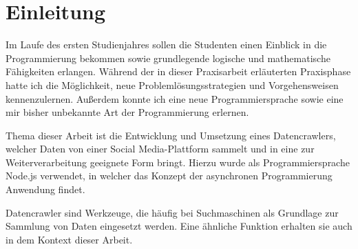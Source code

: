 
\chapter{Einleitung}
Im Laufe des ersten Studienjahres sollen die Studenten einen Einblick in die Programmierung bekommen sowie grundlegende logische und mathematische Fähigkeiten erlangen. Während der in dieser Praxisarbeit erläuterten Praxisphase hatte ich die Möglichkeit, neue Problemlösungsstrategien und Vorgehensweisen kennenzulernen. Außerdem konnte ich eine neue Programmiersprache sowie eine mir bisher unbekannte Art der Programmierung erlernen.

Thema dieser Arbeit ist die Entwicklung und Umsetzung eines Datencrawlers, welcher Daten von einer Social Media-Plattform sammelt und in eine zur Weiterverarbeitung geeignete Form bringt. Hierzu wurde als Programmiersprache Node.js verwendet, in welcher das Konzept der asynchronen Programmierung Anwendung findet. 

Datencrawler sind Werkzeuge, die häufig bei Suchmaschinen als Grundlage zur Sammlung von Daten eingesetzt werden. Eine ähnliche Funktion erhalten sie auch in dem Kontext dieser Arbeit.


